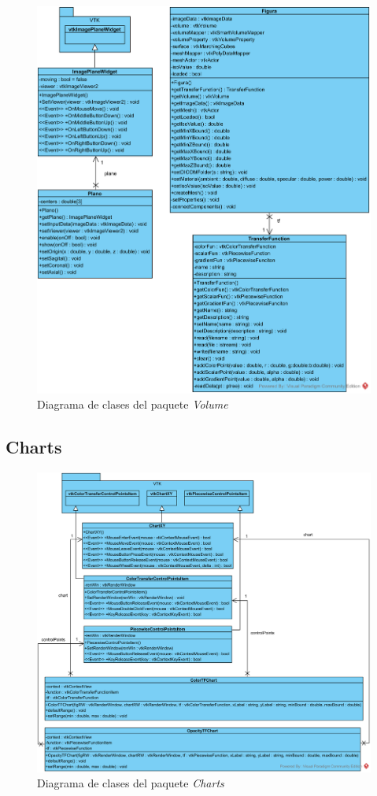 \begin{figure}[H]
	\centering
	\includegraphics[width=12.5cm]{imagenes/diagramas/clases/Volume}
	\caption{Diagrama de clases del paquete \textit{Volume}}
	\label{fig:diagrama_clases_volume}
\end{figure}

\subsection{Charts}

\begin{figure}[H]
	\centering
	\includegraphics[width=12.5cm]{imagenes/diagramas/clases/Charts}
	\caption{Diagrama de clases del paquete \textit{Charts}}
	\label{fig:diagrama_clases_charts}
\end{figure}

